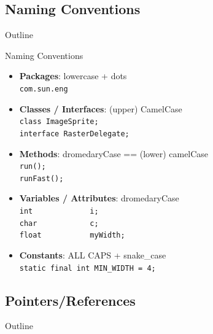 \documentclass[English,c,%
hyperref={%
    pdftitle={FISA-DE2 OOP in Java},%
    pdfauthor={Muller, Gravier, Laforest, Subercaze},%
    pdfsubject={OOP in Java},%
    pdfkeywords={OOP, Java},%
    colorlinks=true,%
    urlcolor=blue,%
    linkcolor=%
    },%
xcolor={pdftex,svgnames} %
]{beamer}
\begin{document}
\subsection{Naming Conventions}
   \begin{frame}{Outline}
       \tableofcontents[currentsubsection]
   \end{frame}

\begin{frame}[fragile]{Naming Conventions}

{\small
  \begin{itemize}
%
    \item \textbf{Packages}: lowercase + dots \\
    \lstinline{com.sun.eng}
    \item \textbf{Classes / Interfaces}: (upper) CamelCase\\
    \lstinline{class ImageSprite;}\\
    \lstinline{interface RasterDelegate;}
%
    \item \textbf{Methods}: dromedaryCase == (lower) camelCase \\
    \lstinline{run();}\\
    \lstinline{runFast();}
%
    \item \textbf{Variables / Attributes}: dromedaryCase \\
    \lstinline{int             i;}\\
    \lstinline{char            c;}\\
    \lstinline{float           myWidth;}
%
    \item \textbf{Constants}: ALL CAPS + snake\_case \\
    \lstinline{static final int MIN_WIDTH = 4;}
%
\end{itemize}
}

\end{frame}

\subsection{Pointers/References}
   \begin{frame}{Outline}
       \tableofcontents[currentsubsection]
   \end{frame}
\end{document}
